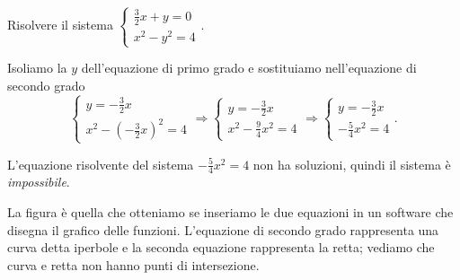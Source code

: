 \begin{esempio}
Risolvere il sistema $\left\{\begin{array}{l}\frac 3 
2x+y=0\\x^2-y^2=4\end{array}\right..$

Isoliamo la $y$ dell'equazione di primo grado e sostituiamo nell'equazione di 
secondo grado 
\[\left\{\begin{array}{l}y=-\frac 3 2x \\
x^2-\left(-\frac 3 2x\right)^2=4\end{array}\right.
\Rightarrow \left\{\begin{array}{l}y=-\frac 3 2x \\
x^2-\frac 9 4x^2=4\end{array}\right.
\Rightarrow \left\{\begin{array}{l}y=-\frac 3 2x\\
-\frac 5 4x^2=4\end{array}\right..\]

L'equazione risolvente del sistema $-\frac 5 4x^2=4$ non ha soluzioni, quindi 
il 
sistema è \emph{impossibile}.
\begin{multicols}{2}
La figura è quella che otteniamo se inseriamo le due equazioni in un software 
che disegna il grafico delle funzioni. 
L'equazione di secondo grado rappresenta una curva detta iperbole e la seconda 
equazione rappresenta la retta; vediamo che curva e retta non hanno punti di 
intersezione.
\begin{center}

\end{center}
\end{multicols}
\end{esempio}

